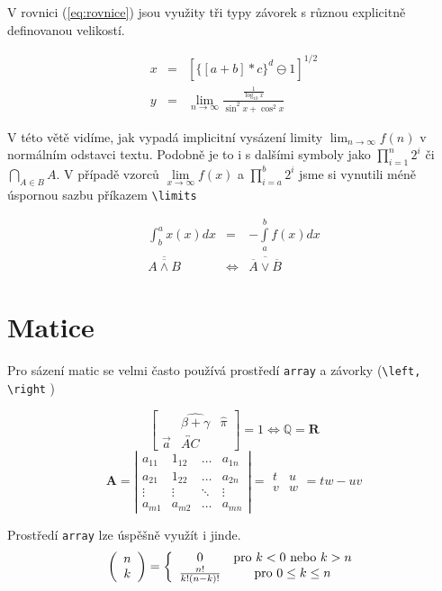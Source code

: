 \documentclass[11pt, a4paper, twocolumn]{article}
\begin{document}
V rovnici (\ref{eq:rovnice}) jsou využity tři typy závorek s různou
explicitně definovanou velikostí.

\begin{eqnarray}
    \label{eq:rovnice}
    x  & = &\left[\Big\{\left[a+b\right] * c\Big\}^d \ominus 1 \right]^{1/2}\\
    y  & = &\lim_{n \to \infty}\frac{\frac{1}{\log_{10} x}}{\sin^2{x}+\cos^2{x}}\nonumber
\end{eqnarray}

V této větě vidíme, jak vypadá implicitní vysázení limity $ \lim_{n \to \infty}f(n)$ v normálním odstavci textu. Podobně je to i s dalšími symboly jako $\prod^n_{i=1} 2^i$ či $\bigcap_{A \in B} A$. V případě vzorců $\lim\limits_{x\to\infty} f(x)$ a $\prod\limits_{i=a}^{b} 2^i$  jsme si vynutili méně úspornou sazbu příkazem \texttt{\textbackslash limits}

\begin{eqnarray}
    \int_{b}^{a} x(x) dx & = & -\int\limits_{a}^{b} f(x) dx\\
     \overline{\overline{A \wedge B}} & \Leftrightarrow & \overline{\overline{A} \vee \overline{B}}
\end{eqnarray}

\section{Matice}
Pro sázení matic se velmi často používá prostředí \texttt{array}
a závorky (\texttt{\textbackslash left, \textbackslash right} )


\begin{equation*}
    \left[
    \begin{array}{ccc}
            & \widehat{\beta + \gamma} & \hat{\pi}\\
        \vec{a} & \overleftrightarrow{AC} &
    \end{array}
    \right]
     = 1 \iff \mathbb{Q} = \mathbf{R}
\end{equation*}
\begin{equation*}   
    \mathbf{A} = 
    \left|
    \begin{array}{cccc}
     a_{11} & 1_{12} & \dots & a_{1n}\\
        a_{21} & 1_{22} & \dots & a_{2n}\\
        \vdots & \vdots & \ddots & \vdots\\
        a_{m1} & a_{m2} & \dots & a_{mn}
    \end{array}         
    \right|=
    \begin{array}{cc}
        t & u \\
        v & w 
    \end{array}
    = tw - uv
\end{equation*}

Prostředí \texttt{array} lze úspěšně využít i jinde.
$$
\left(
\begin{array}{c}
      n\\
      k
 \end{array}
\right)
=
\left\{
\begin{array}{cc}
      0 & \textup{pro } k < 0 \textup{ nebo } k > n\\
      \frac{n!}{k!(n-k)!} & \textup{pro } 0 \leq k \leq n
 \end{array}
\right.
$$
\end{document}
